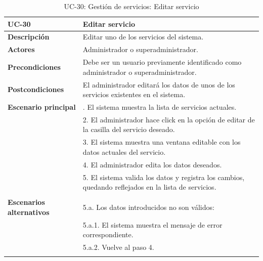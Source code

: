 \begin{table}[H]
  \begin{center}
    \begin{tabularx}{16.4cm}{|l|X|}
      \hline
      \textbf{UC-30} & \textbf{Editar servicio}\\
      \hline
      \textbf{Descripción} & Editar uno de los servicios del sistema.\\
      \hline
      \textbf{Actores} & Administrador o superadministrador.\\
      \hline
      \textbf{Precondiciones} & Debe ser un usuario previamente identificado como administrador o superadministrador.\\
      \hline
      \textbf{Postcondiciones} & El administrador editará los datos de unos de los servicios existentes en el sistema.\\
      \hline
      \textbf{Escenario principal} & \smallskip 1. El sistema muestra la lista de servicios actuales.\\
      & 2. El administrador hace click en la opción de editar de la casilla del servicio deseado.\\
      & 3. El sistema muestra una ventana editable con los datos actuales del servicio.\\
      & 4. El administrador edita los datos deseados.\\
      & 5. El sistema valida los datos y registra los cambios, quedando reflejados en la lista de servicios.\\
      & \\
      \hline
      \textbf{Escenarios alternativos} & \smallskip 5.a. Los datos introducidos no son válidos:\\
      & \hspace{0.3cm} 5.a.1. El sistema muestra el mensaje de error correspondiente.\\
      & \hspace{0.3cm} 5.a.2. Vuelve al paso 4.\\
      & \\
      \hline
    \end{tabularx}
    \caption{UC-30: Gestión de servicios: Editar servicio}
    \label{tab:CU-editar-servicio}
  \end{center}
\end{table}


